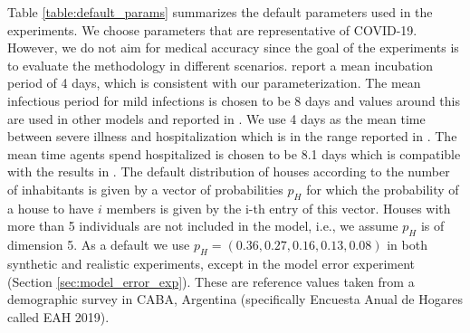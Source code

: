 \documentclass[11pt,a4paper]{article}
\begin{document}
Table \ref{table:default_params} summarizes the default parameters used in the experiments. We choose parameters that are representative of COVID-19. However, we do not aim for medical accuracy since the goal of the experiments is to evaluate the methodology in different scenarios. \cite{Guan2020} report a mean incubation period of 4 days, which is consistent with our parameterization. The mean infectious period for mild infections is chosen to be 8 days and values around this are used in other models \citep{Zhao2020, Ivorra2020} and reported in \cite{Byrne2020}. We use 4 days as the mean time between severe illness and hospitalization which is in the range reported in \cite{Faes2020}. The mean time agents spend hospitalized is chosen to be 8.1 days which is compatible with the results in \cite{Vekaria2021}. The default distribution of houses according to the number of inhabitants is given by a vector of probabilities $p_H$ for which the probability of a house to have $i$ members is given by the i-th entry of this vector. Houses with more than 5 individuals are not included in the model, i.e., we assume $p_H$ is of dimension 5. As a default we use $p_H = (0.36, 0.27, 0.16, 0.13, 0.08)$ in both synthetic and realistic experiments, except in the model error experiment (Section \ref{sec:model_error_exp}). These are reference values taken from a demographic survey in CABA, Argentina (specifically Encuesta Anual de Hogares called EAH 2019).
\end{document}
